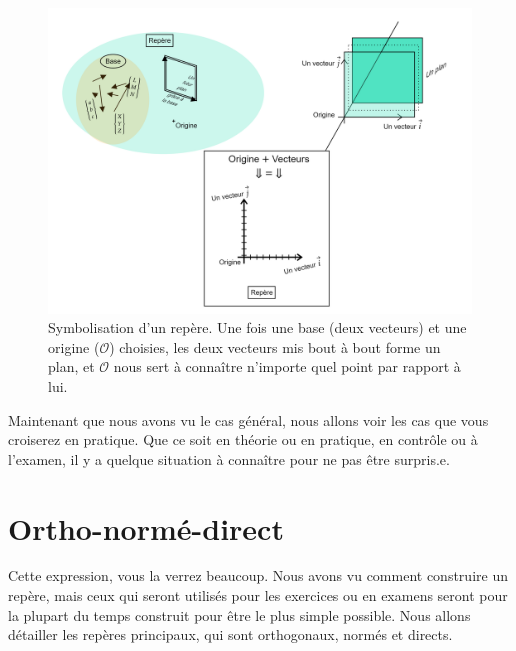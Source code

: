 \documentclass[
	11pt, %
	fleqn, %
	a4paper, %
]{LegrandOrangeBook}
\begin{document}
\begin{figure}[H] %
	\centering %
	\includegraphics[width=1.1\textwidth]{Images/vect2.png} %
	\caption{Symbolisation d'un repère. Une fois une base (deux vecteurs) et une origine ($\mathcal{O}$) choisies, les deux vecteurs mis bout à bout forme un plan, et $\mathcal{O}$ nous sert à connaître n'importe quel point par rapport à lui.}
	\label{vect2} %
\end{figure}

Maintenant que nous avons vu le cas général, nous allons voir les cas que vous croiserez en pratique. Que ce soit en théorie ou en pratique, en contrôle ou à l'examen, il y a quelque situation à connaître pour ne pas être surpris.e.

\section{Ortho-normé-direct}

Cette expression, vous la verrez beaucoup. Nous avons vu comment construire un repère, mais ceux qui seront utilisés pour les exercices ou en examens seront pour la plupart du temps construit pour être le plus simple possible. Nous allons détailler les repères principaux, qui sont orthogonaux, normés et directs.
\end{document}
